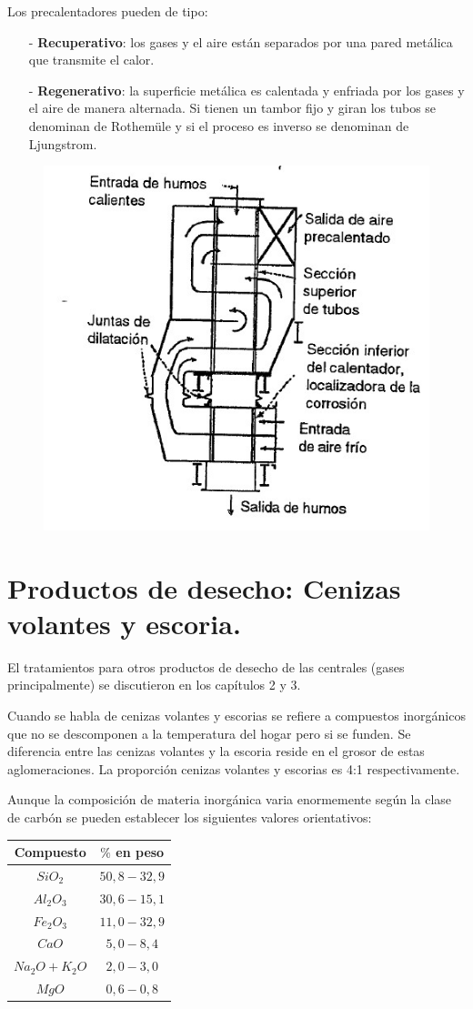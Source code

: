 Los precalentadores pueden de tipo:
\begin{itemize}
	\item [-] \textbf{Recuperativo}: los gases y el aire están separados por una pared metálica que transmite el calor.
	\item [-] \textbf{Regenerativo}: la superficie metálica es calentada y enfriada por los gases y el aire de manera alternada. Si tienen un tambor fijo y giran los tubos se denominan de Rothemüle y si el proceso es inverso se denominan de Ljungstrom. 
\end{itemize}
\begin{figure}[H]
	\centering
	\includegraphics[width=0.4\linewidth]{res/tema10/precalentador}
	\label{fig:precalentador}
\end{figure}



\section{Productos de desecho: Cenizas volantes y escoria.}
El tratamientos para otros productos de desecho de las centrales (gases principalmente) se discutieron en los capítulos 2 y 3. 


Cuando se habla de cenizas volantes y escorias se refiere a compuestos inorgánicos que no se descomponen a la temperatura del hogar pero si se funden. Se diferencia entre las cenizas volantes y la escoria reside en el grosor de estas aglomeraciones. La proporción cenizas volantes y escorias es 4:1 respectivamente.





 Aunque la composición de materia inorgánica varia enormemente según la clase de carbón se pueden establecer los siguientes valores orientativos:
\begin{table}[H]
	\centering
	\renewcommand{\arraystretch}{1.5}
	\begin{tabular}{|c|c|}
		\hline
		Compuesto&$\%$  en peso\\
		\hline
		$SiO_2$&$50,8-32,9$\\
		\hline
		$Al_2O_3$&$30,6-15,1$\\
		\hline
		$Fe_2O_3$&$11,0-32,9$\\
		\hline
		$CaO$&$5,0-8,4$\\
		\hline
		$Na_2O+K_2O$&$2,0-3,0$\\
		\hline
		$MgO$&$0,6-0,8$\\
		\hline
	\end{tabular}
\end{table}



